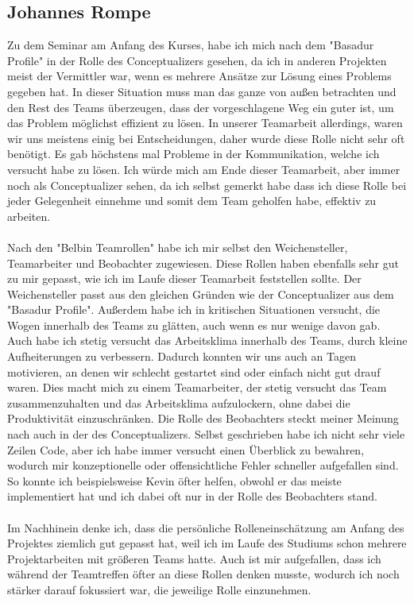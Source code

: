 \documentclass[12pt]{article}
\begin{document}
\clearpage
\subsection{Johannes Rompe}
Zu dem Seminar am Anfang des Kurses, habe ich mich nach dem "Basadur Profile" in der Rolle des Conceptualizers gesehen, da ich in anderen Projekten meist der Vermittler war, wenn es mehrere Ansätze zur Lösung eines Problems gegeben hat. In dieser Situation muss man das ganze von außen betrachten und den Rest des Teams überzeugen, dass der vorgeschlagene Weg ein guter ist, um das Problem möglichst effizient zu lösen. In unserer Teamarbeit allerdings, waren wir uns meistens einig bei Entscheidungen, daher wurde diese Rolle nicht sehr oft benötigt. Es gab höchstens mal Probleme in der Kommunikation, welche ich versucht habe zu lösen. Ich würde mich am Ende dieser Teamarbeit, aber immer noch als Conceptualizer sehen, da ich selbst gemerkt habe dass ich diese Rolle bei jeder Gelegenheit einnehme und somit dem Team geholfen habe, effektiv zu arbeiten.
\\ \\
Nach den "Belbin Teamrollen" habe ich mir selbst den Weichensteller, Teamarbeiter und Beobachter zugewiesen. Diese Rollen haben ebenfalls sehr gut zu mir gepasst, wie ich im Laufe dieser Teamarbeit feststellen sollte. Der Weichensteller passt aus den gleichen Gründen wie der Conceptualizer aus dem "Basadur Profile". Außerdem habe ich in kritischen Situationen versucht, die Wogen innerhalb des Teams zu glätten, auch wenn es nur wenige davon gab. Auch habe ich stetig versucht das Arbeitsklima innerhalb des Teams, durch kleine Aufheiterungen zu verbessern. Dadurch konnten wir uns auch an Tagen motivieren, an denen wir schlecht gestartet sind oder einfach nicht gut drauf waren. Dies macht mich zu einem Teamarbeiter, der stetig versucht das Team zusammenzuhalten und das Arbeitsklima aufzulockern, ohne dabei die Produktivität einzuschränken. Die Rolle des Beobachters steckt meiner Meinung nach auch in der des Conceptualizers. Selbst geschrieben habe ich nicht sehr viele Zeilen Code, aber ich habe immer versucht einen Überblick zu bewahren, wodurch mir konzeptionelle oder offensichtliche Fehler schneller aufgefallen sind. So konnte ich beispielsweise Kevin öfter helfen, obwohl er das meiste implementiert hat und ich dabei oft nur in der Rolle des Beobachters stand.
\\ \\
Im Nachhinein denke ich, dass die persönliche Rolleneinschätzung am Anfang des Projektes ziemlich gut gepasst hat, weil ich im Laufe des Studiums schon mehrere Projektarbeiten mit größeren Teams hatte. Auch ist mir aufgefallen, dass ich während der Teamtreffen öfter an diese Rollen denken musste, wodurch ich noch stärker darauf fokussiert war, die jeweilige Rolle einzunehmen.
\end{document}
